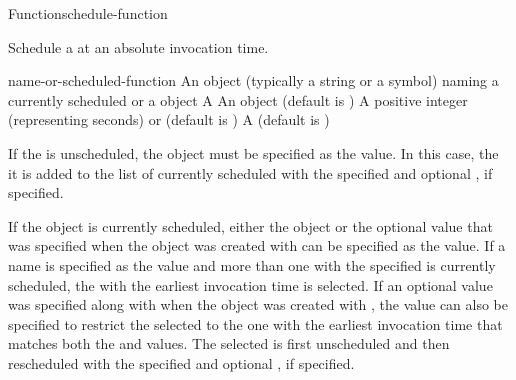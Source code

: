 \documentclass[10pt,twoside,english,pdftex]{article}
\begin{document}
\begin{functiondoc}{Function}{schedule-function}%
  {
    }
%
%
%

\fnsyntax

\fnpurpose Schedule a  at an absolute invocation time.

\fnpackage {}

\fnmodule {}

\fnargs
\begin{args}{name-or-scheduled-function}
 An object (typically a string or a
  symbol) naming a currently scheduled  or a
   object
 A 
\arg[marker] An object (default is \nil)
 A positive integer (representing seconds) or
  \nil{} (default is \nil)
\arg[verbose] A  
  (default is )
\end{args}

\fnerrors
\nothreads{}

\fndescription If the  is unscheduled, the
 object must be specified as the
 value.  In this case, the
 it is added to the list of currently
scheduled  with the specified
 and optional , if
specified.

If the  object is currently scheduled, either
the  object or the optional  value
that was specified when the  object was
created with  can be
specified as the  value.  If a name
is specified as the  value and more
than one  with the specified  is
currently scheduled, the  with the earliest
invocation time is selected.  If an optional  value was
specified along with  when the 
object was created with , the
 value can also be specified to restrict the selected
 to the one with the earliest invocation time
that matches both the  and  values.  The selected
 is first unscheduled and then rescheduled
with the specified  and optional
, if specified.


\end{functiondoc}
\end{document}
